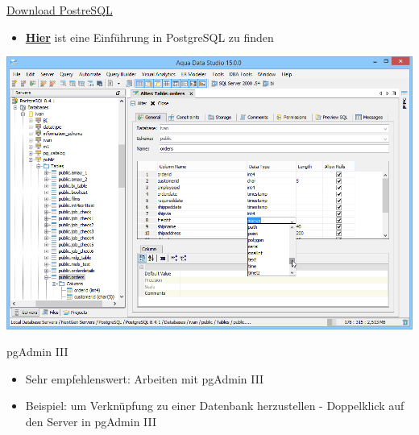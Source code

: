 \documentclass[ignorenonframetext,]{beamer}
\providecommand{\tightlist}{%
  \setlength{\itemsep}{0pt}\setlength{\parskip}{0pt}}
\begin{document}
\begin{frame}{\href{http://www.postgresql.org/download/windows/}{Download
PostreSQL}}
\protect\hypertarget{download-postresql}{}

\begin{itemize}
\tightlist
\item
  \href{https://datashenanigan.wordpress.com/2015/05/18/getting-started-with-postgresql-in-r/}{\textbf{Hier}}
  ist eine Einführung in PostgreSQL zu finden
\end{itemize}

\includegraphics{figure/aquadatastudio_postgresql_visual_table_editing.png}

\end{frame}

\begin{frame}{pgAdmin III}
\protect\hypertarget{pgadmin-iii}{}

\begin{itemize}
\tightlist
\item
  Sehr empfehlenswert: Arbeiten mit pgAdmin III
\item
  Beispiel: um Verknüpfung zu einer Datenbank herzustellen - Doppelklick
  auf den Server in pgAdmin III
\end{itemize}

\end{frame}
\end{document}
